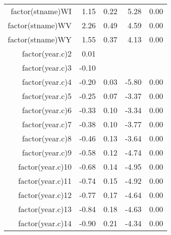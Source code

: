\begin{table}[ht]
\begin{tabular}{rrrrr}
  factor(stname)WI & 1.15 & 0.22 & 5.28 & 0.00 \\ 
  factor(stname)WV & 2.26 & 0.49 & 4.59 & 0.00 \\ 
  factor(stname)WY & 1.55 & 0.37 & 4.13 & 0.00 \\ 
  factor(year.c)2 & 0.01 &  &  &  \\ 
  factor(year.c)3 & -0.10 &  &  &  \\ 
  factor(year.c)4 & -0.20 & 0.03 & -5.80 & 0.00 \\ 
  factor(year.c)5 & -0.25 & 0.07 & -3.37 & 0.00 \\ 
  factor(year.c)6 & -0.33 & 0.10 & -3.34 & 0.00 \\ 
  factor(year.c)7 & -0.38 & 0.10 & -3.77 & 0.00 \\ 
  factor(year.c)8 & -0.46 & 0.13 & -3.64 & 0.00 \\ 
  factor(year.c)9 & -0.58 & 0.12 & -4.74 & 0.00 \\ 
  factor(year.c)10 & -0.68 & 0.14 & -4.95 & 0.00 \\ 
  factor(year.c)11 & -0.74 & 0.15 & -4.92 & 0.00 \\ 
  factor(year.c)12 & -0.77 & 0.17 & -4.64 & 0.00 \\ 
  factor(year.c)13 & -0.84 & 0.18 & -4.63 & 0.00 \\ 
  factor(year.c)14 & -0.90 & 0.21 & -4.34 & 0.00 \\ 
   \hline
\end{tabular}
\end{table}
